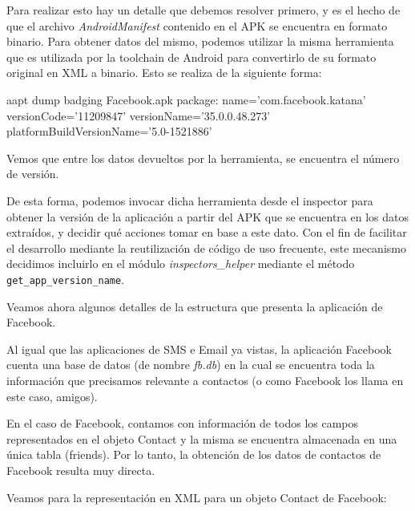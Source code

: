 Para realizar esto hay un detalle que debemos resolver primero, y es el hecho de que el archivo \emph{AndroidManifest} contenido en el APK se encuentra en formato binario. Para obtener datos del mismo, podemos utilizar la misma herramienta que es utilizada por la toolchain de Android para convertirlo de su formato original en XML a binario. Esto se realiza de la siguiente forma:
\newline

\begin{bash}
aapt dump badging Facebook.apk
package: name='com.facebook.katana' versionCode='11209847' versionName='35.0.0.48.273' platformBuildVersionName='5.0-1521886'
\end{bash}

Vemos que entre los datos devueltos por la herramienta, se encuentra el número de versión.

De esta forma, podemos invocar dicha herramienta desde el inspector para obtener la versión de la aplicación a partir del APK que se encuentra en los datos extraídos, y decidir qué acciones tomar en base a este dato. Con el fin de facilitar el desarrollo mediante la reutilización de código de uso frecuente, este mecanismo decidimos incluirlo en el módulo \emph{inspectors\_helper} mediante el método \texttt{get\_app\_version\_name}.

Veamos ahora algunos detalles de la estructura que presenta la aplicación de Facebook.

Al igual que las aplicaciones de SMS e Email ya vistas, la aplicación Facebook cuenta una base de datos (de nombre \emph{fb.db}) en la cual se encuentra toda la información que precisamos relevante a contactos (o como Facebook los llama en este caso, amigos).

En el caso de Facebook, contamos con información de todos los campos representados en el objeto Contact y la misma se encuentra almacenada en una única tabla (friends). Por lo tanto, la obtención de los datos de contactos de Facebook resulta muy directa.

Veamos para la representación en XML para un objeto Contact de Facebook:
\newline

